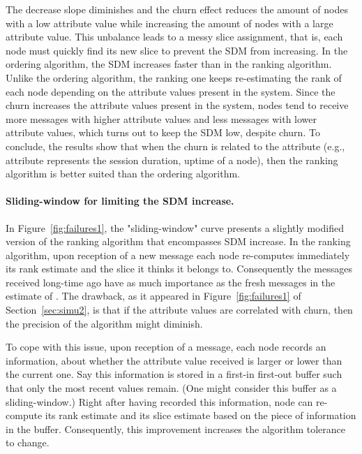 \documentclass[times,10pt,twocolumn]{article}
\begin{document}
The decrease slope 
diminishes and the churn effect reduces the amount of nodes with a low attribute 
value while increasing the amount of nodes with a large attribute value.
This unbalance leads to a messy slice assignment, that is, each node must quickly
find its new slice to prevent the SDM from increasing.
In the ordering algorithm, the SDM increases faster than in the ranking algorithm.
Unlike the ordering algorithm, the 
ranking one keeps re-estimating the rank of each node depending on the 
attribute values present in the system.
Since the churn increases the attribute values present in the 
system, nodes tend to receive more messages with higher attribute values and 
less messages with lower attribute values, which turns out to keep the SDM 
low, despite churn. 
To conclude, the results show that when the churn is related to the attribute 
(e.g., attribute represents the session duration, uptime of a node), 
then the ranking algorithm is better suited than the ordering algorithm.  


\paragraph{Sliding-window for limiting the SDM increase.}

In Figure~\ref{fig:failures1}, the "sliding-window" curve 
presents 
a slightly modified version of the ranking algorithm
that encompasses SDM increase. 
In the ranking algorithm,
upon reception of a new message each node  re-computes
immediately its rank estimate and the slice it thinks it belongs to. 
Consequently the messages
received long-time ago have as much importance as the fresh messages
in the estimate of .
The drawback, as it appeared in Figure~\ref{fig:failures1} of Section~\ref{sec:simu2}, is that if  
the attribute values are correlated with churn, then the precision of the algorithm might diminish.

To cope with this issue, 
upon reception of a message, each node
records an information, about whether the attribute value received 
is larger or lower than the current one. 
Say this information is stored in a first-in first-out buffer such that
only the most recent values remain. 
(One might consider this buffer as a sliding-window.)
Right after having recorded this information, node  can re-compute 
its rank estimate and its slice estimate based on the piece of information in the buffer.
Consequently, this improvement increases the algorithm tolerance to change.


\label{conclusion}
\end{document}
